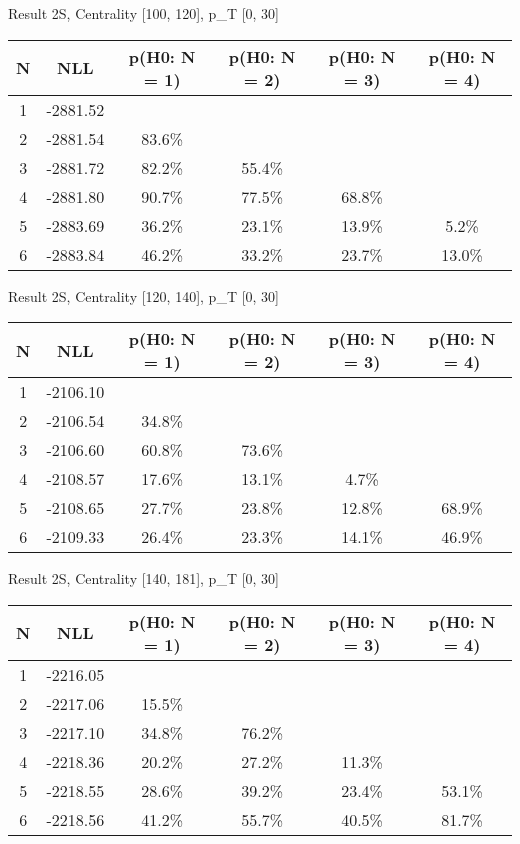Result 2S, Centrality [100, 120], p_{T} [0, 30]
\begin{table}[h!]
	\centering
	\begin{tabular}{cc||cccc}
		N & NLL & p(H0: N = 1) & p(H0: N = 2) & p(H0: N = 3) & p(H0: N = 4)\\ 
		\hline
1 & -2881.52 & & & & \\
2 & -2881.54 & 83.6\% & & & \\
3 & -2881.72 & 82.2\% & 55.4\% & & \\
4 & -2881.80 & 90.7\% & 77.5\% & 68.8\% & \\
5 & -2883.69 & 36.2\% & 23.1\% & 13.9\% & 5.2\% \\
6 & -2883.84 & 46.2\% & 33.2\% & 23.7\% & 13.0\% \\
	\end{tabular}
	\label{tab:lab}
\end{table}

Result 2S, Centrality [120, 140], p_{T} [0, 30]
\begin{table}[h!]
	\centering
	\begin{tabular}{cc||cccc}
		N & NLL & p(H0: N = 1) & p(H0: N = 2) & p(H0: N = 3) & p(H0: N = 4)\\ 
		\hline
1 & -2106.10 & & & & \\
2 & -2106.54 & 34.8\% & & & \\
3 & -2106.60 & 60.8\% & 73.6\% & & \\
4 & -2108.57 & 17.6\% & 13.1\% & 4.7\% & \\
5 & -2108.65 & 27.7\% & 23.8\% & 12.8\% & 68.9\% \\
6 & -2109.33 & 26.4\% & 23.3\% & 14.1\% & 46.9\% \\
	\end{tabular}
	\label{tab:lab}
\end{table}

Result 2S, Centrality [140, 181], p_{T} [0, 30]
\begin{table}[h!]
	\centering
	\begin{tabular}{cc||cccc}
		N & NLL & p(H0: N = 1) & p(H0: N = 2) & p(H0: N = 3) & p(H0: N = 4)\\ 
		\hline
1 & -2216.05 & & & & \\
2 & -2217.06 & 15.5\% & & & \\
3 & -2217.10 & 34.8\% & 76.2\% & & \\
4 & -2218.36 & 20.2\% & 27.2\% & 11.3\% & \\
5 & -2218.55 & 28.6\% & 39.2\% & 23.4\% & 53.1\% \\
6 & -2218.56 & 41.2\% & 55.7\% & 40.5\% & 81.7\% \\
	\end{tabular}
	\label{tab:lab}
\end{table}

